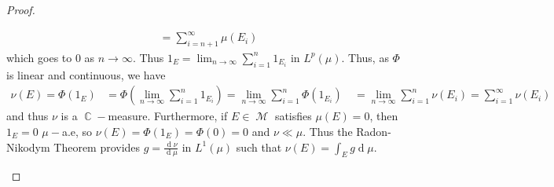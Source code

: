 \documentclass[12pt, a4paper]{memoir}
\DeclareMathOperator{\C}{{\mathbb{C}}}
\theoremstyle{nonumberplain}
\newtheorem{proof}{Proof}
\DeclareMathOperator{\M}{\mathcal{M}}
\renewcommand{\d}[1]{\ensuremath{\operatorname{d}\!{#1}}} %
\begin{document}
\begin{proof}
\begin{enumerate}[label=(\roman*)]
\begin{align*}
                                                    &= \sum_{i=n+1}^\infty\mu(E_i)
            \end{align*}
            which goes to $0$ as $n\to\infty$.
            Thus $1_E=\lim_{n\to\infty}\sum_{i=1}^n 1_{E_i}$ in $L^p(\mu)$.
            Thus, as $\Phi$ is linear and continuous, we have
            \begin{align*}
                \nu(E)=\Phi(1_E) &= \Phi\left(\lim_{n\to\infty}\sum_{i=1}^n 1_{E_i}\right)=\lim_{n\to\infty}\sum_{i=1}^n\Phi(1_{E_i})\
                                 &= \lim_{n\to\infty}\sum_{i=1}^n\nu(E_i)=\sum_{i=1}^\infty\nu(E_i)
            \end{align*}
            and thus $\nu$ is a $\C-$measure.
            Furthermore, if $E\in\M$ satisfies $\mu(E)=0$, then $1_E=0$ $\mu-$a.e, so $\nu(E)=\Phi(1_E)=\Phi(0)=0$ and $\nu\ll\mu$.
            Thus the Radon-Nikodym Theorem provides $g=\frac{\d{\nu}}{\d{\mu}}$ in $L^1(\mu)$ such that $\nu(E)=\int_E g\d{\mu}$.


\end{enumerate}
\end{proof}
\end{document}
